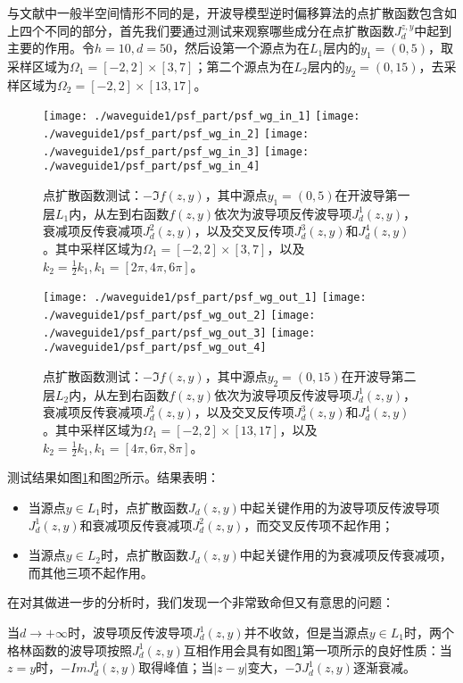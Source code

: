 与文献\cite{ch_ha}中一般半空间情形不同的是，开波导模型逆时偏移算法的点扩散函数包含如上四个不同的部分，首先我们要通过测试来观察哪些成分在点扩散函数$J_d^{z,y}$中起到主要的作用。令$h=10,d=50$，然后设第一个源点为在$L_1$层内的$y_1=(0,5)$，取采样区域为$\Omega_1=[-2,2]\times[3,7]$；第二个源点为在$L_2$层内的$y_2=(0,15)$，去采样区域为$\Omega_2=[-2,2]\times[13,17]$。
\begin{figure}[htbp]
	\centering
	\texttt{[image: ./waveguide1/psf\_part/psf\_wg\_in\_1]}
	\texttt{[image: ./waveguide1/psf\_part/psf\_wg\_in\_2]}
	\texttt{[image: ./waveguide1/psf\_part/psf\_wg\_in\_3]}
	\texttt{[image: ./waveguide1/psf\_part/psf\_wg\_in\_4]}
	\caption{点扩散函数测试：$-\Im f(z,y)$，其中源点$y_1=(0,5)$在开波导第一层$L_1$内，从左到右函数$f(z,y)$依次为波导项反传波导项$J_d^1(z,y)$，衰减项反传衰减项$J_d^2(z,y)$，以及交叉反传项$J_d^3(z,y)$和$J_d^4(z,y)$。其中采样区域为$\Omega_1=[-2,2]\times[3,7]$，以及$k_2=\frac{1}{2}k_1,k_1=[2\pi,4\pi,6\pi]$。}\label{psf_wg_part_in}
\end{figure}
\begin{figure}[htbp]
	\centering
	\texttt{[image: ./waveguide1/psf\_part/psf\_wg\_out\_1]}
	\texttt{[image: ./waveguide1/psf\_part/psf\_wg\_out\_2]}
	\texttt{[image: ./waveguide1/psf\_part/psf\_wg\_out\_3]}
	\texttt{[image: ./waveguide1/psf\_part/psf\_wg\_out\_4]}
	\caption{点扩散函数测试：$-\Im f(z,y)$，其中源点$y_2=(0,15)$在开波导第二层$L_2$内，从左到右函数$f(z,y)$依次为波导项反传波导项$J_d^1(z,y)$，衰减项反传衰减项$J_d^2(z,y)$，以及交叉反传项$J_d^3(z,y)$和$J_d^4(z,y)$。其中采样区域为$\Omega_1=[-2,2]\times[13,17]$，以及$k_2=\frac{1}{2}k_1,k_1=[4\pi,6\pi,8\pi]$。}\label{psf_wg_part_out}
\end{figure}
测试结果如图\ref{psf_wg_part_in}和图\ref{psf_wg_part_out}所示。结果表明：
\begin{itemize}
	\item 当源点$y\in L_1$时，点扩散函数$J_d(z,y)$中起关键作用的为波导项反传波导项$J^1_d(z,y)$和衰减项反传衰减项$J^2_d(z,y)$，而交叉反传项不起作用；
	\item 当源点$y\in L_2$时，点扩散函数$J_d(z,y)$中起关键作用的为衰减项反传衰减项，而其他三项不起作用。
\end{itemize}

在对其做进一步的分析时，我们发现一个非常致命但又有意思的问题：

\begin{question}\label{pro_fatal}
 当$d\rightarrow+\infty$时，波导项反传波导项$J_d^1(z,y)$并不收敛，但是当源点$y\in L_1$时，两个格林函数的波导项按照$J_d^1(z,y)$互相作用会具有如图\ref{psf_wg_part_in}第一项所示的良好性质：当$z=y$时，$-Im J_d^1(z,y)$取得峰值；当$|z-y|$变大，$-\Im J_d^1(z,y)$逐渐衰减。
\end{question}

